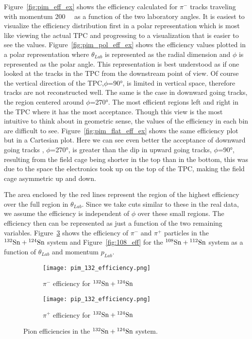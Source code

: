 Figure~\ref{fig:pim_eff_ex} shows the efficiency calculated for $\pi^-$ tracks traveling with momentum \SI{200}{\mega\eVperc} as a function of the two laboratory angles. It is easiest to visualize the efficiency distribution first in a polar representation which is most like viewing the actual TPC and progressing to a visualization that is easier to see the values. Figure~\ref{fig:pim_pol_eff_ex} shows the efficiency values plotted in a polar representation where $\theta_{Lab}$ is represented as the radial dimension and $\phi$ is represented as the polar angle. This representation is best understood as if one looked at the tracks in the TPC from the downstream point of view. Of course the vertical direction of the TPC,$\phi$=\ang{90}, is limited in vertical space, therefore tracks are not reconstructed well. The same is the case in downward going tracks, the region centered around $\phi$=\ang{270}. The most efficient regions left and right in the TPC where it has the most acceptance. Though this view is the most intuitive to think about in geometric sense, the values of the efficiency in each bin are difficult to see. Figure~\ref{fig:pim_flat_eff_ex} shows the same efficiency plot but in a Cartesian plot. Here we can see even better the acceptance of downward going tracks , $\phi$=\ang{270}, is greater than the dip in upward going tracks, $\phi$=\ang{90}, resulting from the field cage being shorter in the top than in the bottom, this was due to the space the electronics took up on the top of the TPC, making the field cage asymmetric up and down. 

The area enclosed by the red lines represent the region of the highest efficiency over the full region in $\theta_{Lab}$.  Since we take cuts similar to these in the real data, we assume the efficiency is independent of $\phi$ over these small regions. The efficiency then can be represented as just a function of the two remaining variables. Figure~\ref{fig:132_eff} shows the efficiency of $\pi^-$ and $\pi^+$ particles in the ${}^{132}\mathrm{Sn} + {}^{124}\mathrm{Sn}$ system and Figure~\ref{fig:108_eff} for the ${}^{108}\mathrm{Sn} + {}^{112}\mathrm{Sn}$ system as a function of $\theta_{Lab}$ and momentum $p_{Lab}$. 



\begin{figure}[!htb]
    \centering
    \begin{subfigure}[t]{0.49\textwidth}
        \centering
        \texttt{[image: pim\_132\_efficiency.png]}
        \caption{$\pi^-$ efficiency for ${}^{132}\mathrm{Sn} + {}^{124}\mathrm{Sn}$} \label{fig:pim_132_eff}
    \end{subfigure}
    \hfill
    \begin{subfigure}[t]{.49\textwidth}
        \centering
        \texttt{[image: pip\_132\_efficiency.png]} 
        \caption{$\pi^+$ efficiency for ${}^{132}\mathrm{Sn} + {}^{124}\mathrm{Sn}$} \label{fig:pip_132_eff}
    \end{subfigure}
  
    \caption{Pion efficiencies in the ${}^{132}\mathrm{Sn} + {}^{124}\mathrm{Sn}$ system. }
\label{fig:132_eff}
\end{figure}



